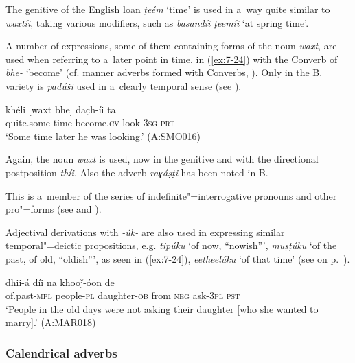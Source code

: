 The genitive of the English loan \textit{ṭeém} `time' is used in a~way quite similar to \textit{waxtíi}, taking various modifiers, such as \textit{basandíi ṭeemíi} `at spring time'.


 A number of expressions, some of them containing forms of the noun \textit{waxt}, are used when referring to a~later point in time, in (\ref{ex:7-24}) with the Converb of \textit{bhe-} `become' (cf. manner adverbs formed with Converbs, ). Only in the B. variety is \textit{padúši} used in a~clearly temporal sense (see ).

\begin{exe}
\ex
\label{ex:7-24}
\gll khéli [waxt bhe] dac̣h-íi ta \\
quite.some time become.\textsc{cv} look-\textsc{3sg} \textsc{prt}\\
\glt `Some time later he was looking.' (A:SMO016) 
\end{exe}

 Again, the noun \textit{waxt} is used, now in the genitive and with the directional postposition \textit{thíi}. Also the adverb \textit{raɣáṣṭi} has been noted in B.


 This is a~member of the series of
indefinite"=interrogative pronouns and other pro"=forms (see  and
).


Adjectival derivations with \textit{-úk-} are also used in expressing similar temporal"=deictic propositions, e.g. \textit{tipúku} `of now, ``nowish''', \textit{muṣṭúku} `of the past, of old, ``oldish''', as seen in (\ref{ex:7-24}), \textit{eetheelúku} `of that time' (see  on p.~\pageref{tab:7-2}). 

\begin{exe}
\ex
\label{ex:7-25}
 dhii-á díi na khooǰ-óon de \\
of.past-\textsc{mpl} people-\textsc{pl}  daughter-\textsc{ob} from \textsc{neg} ask-\textsc{3pl} \textsc{pst}  \\
\glt `People in the old days were not asking their daughter [who she wanted to marry].' (A:MAR018)
\end{exe}

\subsubsection*{Calendrical adverbs}

